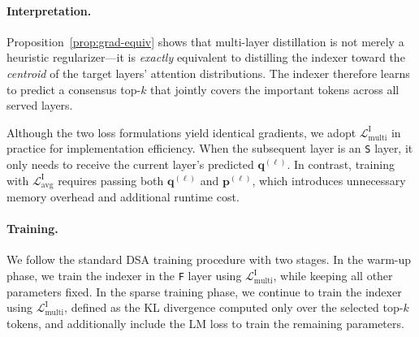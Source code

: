 \paragraph{Interpretation.}
Proposition~\ref{prop:grad-equiv} shows that multi-layer distillation is not merely a heuristic regularizer---it is \emph{exactly} equivalent to distilling the indexer toward the \emph{centroid} of the target layers' attention distributions.
The indexer therefore learns to predict a consensus top-$k$ that jointly covers the important tokens across all served layers.

Although the two loss formulations yield identical gradients, we adopt
$\mathcal{L}^{\mathrm{I}}_{\mathrm{multi}}$ in practice for implementation
efficiency.
When the subsequent layer is an \texttt{S} layer, it only needs to receive the current layer’s predicted $\mathbf{q}^{(\ell)}$. In contrast, training with $\mathcal{L}^{\mathrm{I}}_{\mathrm{avg}}$ requires passing both $\mathbf{q}^{(\ell)}$ and $\mathbf{p}^{(\ell)}$, which introduces unnecessary memory overhead and additional runtime cost.

\paragraph{Training.}
We follow the standard DSA training procedure with two stages. In the warm-up phase, we train the indexer in the \texttt{F} layer using $\mathcal{L}^{\mathrm{I}}_{\mathrm{multi}}$, while keeping all other parameters fixed. In the sparse training phase, we continue to train the indexer using $\mathcal{L}^{\mathrm{I}}_{\mathrm{multi}}$, defined as the KL divergence computed only over the selected top-$k$ tokens, and additionally include the LM loss to train the remaining parameters.
